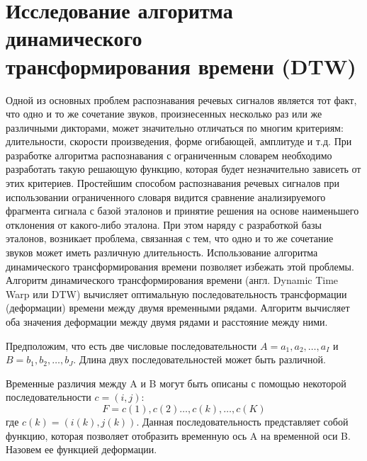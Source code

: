 \documentclass[a4paper,14pt,russian,utf8,nocolumnsxix,nocolumnxxxi,nocolumnxxxii]{eskdtext}
\begin{document}
\section[Исследование алгоритма динамического \\ трансформирования времени (DTW)]{Исследование алгоритма динамического \\трансформирования времени (DTW)}
\setcounter{figure}{0} 
Одной из основных проблем распознавания речевых сигналов является тот факт, что одно и то же сочетание звуков, произнесенных несколько раз или же различными дикторами, может значительно отличаться по многим критериям: длительности, скорости произведения, форме огибающей, амплитуде и т.д. При разработке алгоритма распознавания с ограниченным словарем необходимо разработать такую решающую функцию, которая будет незначительно зависеть от этих критериев.
Простейшим способом распознавания речевых сигналов при использовании ограниченного словаря видится сравнение анализируемого фрагмента сигнала с базой эталонов и принятие решения на основе наименьшего отклонения от какого-либо эталона. При этом наряду с разработкой базы эталонов, возникает проблема, связанная с тем, что одно и то же сочетание звуков может иметь различную длительность. Использование алгоритма динамического трансформирования времени позволяет избежать этой проблемы.
Алгоритм динамического трансформирования времени (англ. Dynamic Time Warp или DTW) вычисляет оптимальную последовательность трансформации (деформации) времени между двумя временными рядами. Алгоритм вычисляет оба значения деформации между двумя рядами и расстояние между ними.\cite{sakoe}

Предположим, что есть две числовые последовательности $A= a_{1}, a_{2}, \dots, a_{I}$ и $B=b_{1}, b_{2}, \dots, b_{J}$. Длина двух последовательностей может быть различной.

Временные различия между A и B могут быть описаны с помощью некоторой последовательности $c=(i,j)$:
\begin{equation}
	F=c(1),c(2)\dots,c(k),\dots,c(K)
	\label{eq:F}
\end{equation}
где $c(k)=(i(k),j(k))$.
Данная последовательность представляет собой функцию, которая позволяет отобразить временную ось A на временной оси B. Назовем ее функцией деформации. \cite{sakoe}
\end{document}
